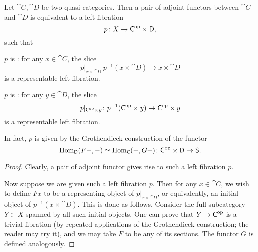 \begin{proposition} \label{thm-6-d}
    Let $\cat C,\cat D$ be two quasi-categories.
    Then a pair of adjoint functors between $\cat C$ and $\cat D$
    is equivalent to a left fibration 
    \[ p\colon X\to\textup{\textsf{C}}^{\mathrm{op}}\times\textup{\textsf{D}}, \]
    such that 
    \begin{itms}
        \item $p$ is :
        for any $x\in\cat C$, the slice 
        \[ p|_{x\times\cat D}\:p^{-1}(x\times\cat D)\to x\times\cat D \]
        is a representable left fibration.
        \item $p$ is :
        for any $y\in\cat D$, the slice 
        \[ p|_{\textup{\textsf{C}}^{\mathrm{op}}\times y}\colon p^{-1}(\textup{\textsf{C}}^{\mathrm{op}}\times y)\to \textup{\textsf{C}}^{\mathrm{op}}\times y \]
        is a representable left fibration.
    \end{itms}
    In fact, $p$ is given by the Grothendieck construction 
    of the functor
    \[ \operatorname{Hom}_{\textup{\textsf{D}}}(F-,-)\simeq\operatorname{Hom}_{\textup{\textsf{C}}}(-,G-)\colon\textup{\textsf{C}}^{\mathrm{op}}\times\textup{\textsf{D}}\to\textup{\textsf{S}}. \]
\end{proposition}

\begin{proof}
    Clearly, a pair of adjoint functor gives rise to such a left fibration $p$.

    Now suppose we are given such a left fibration $p$.
    Then for any $x\in\cat{C}$, we wish to define $Fx$ to be 
    a representing object of $p|_{x\times\cat{D}}$,
    or equivalently, an initial object of $p^{-1}(x\times\cat{D})$.
    This is done as follows.
    Consider the full subcategory $Y \subset X$ spanned by all such initial objects.
    One can prove that $Y\to\textup{\textsf{C}}^{\mathrm{op}}$ is a trivial fibration
    (by repeated applications of the Grothendieck construction; the reader may try it),
    and we may take $F$ to be any of its sections.
    The functor $G$ is defined analogously.
\end{proof}


